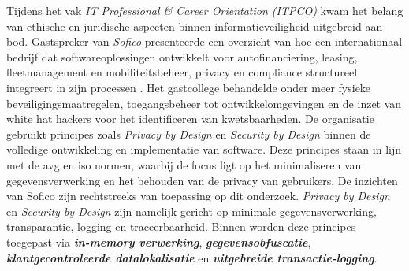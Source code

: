 Tijdens het vak \textit{IT Professional \& Career Orientation (ITPCO)} kwam het belang van ethische en juridische aspecten binnen informatieveiligheid uitgebreid aan bod. 
Gastspreker \textcite{SoficoGuestLecture2024} van \textit{Sofico} presenteerde een overzicht van hoe een internationaal bedrijf dat softwareoplossingen ontwikkelt voor autofinanciering, 
leasing, fleetmanagement en mobiliteitsbeheer, privacy en compliance structureel integreert in zijn processen \autocite{SoficoGuestLecture2024}. 
Het gastcollege behandelde onder meer fysieke beveiligingsmaatregelen, toegangsbeheer tot ontwikkelomgevingen en de inzet van white hat hackers voor het identificeren van kwetsbaarheden.
De organisatie gebruikt principes zoals \textit{Privacy by Design} en \textit{Security by Design} binnen de volledige ontwikkeling en implementatie van software. 
Deze principes staan in lijn met de \gls{avg} en \gls{iso} normen, waarbij de focus ligt op het minimaliseren van gegevensverwerking en het behouden van de privacy van gebruikers.
De inzichten van Sofico zijn rechtstreeks van toepassing op dit onderzoek.
\textit{Privacy by Design} en \textit{Security by Design} zijn namelijk gericht op minimale gegevensverwerking, transparantie, logging en traceerbaarheid. 
Binnen \textcite{Netskope2024PrivByDesign} worden deze principes toegepast via \textit{\textbf{in-memory verwerking}}, \textit{\textbf{gegevensobfuscatie}}, \textit{\textbf{klantgecontroleerde datalokalisatie}} en \textit{\textbf{uitgebreide transactie-logging}}.





